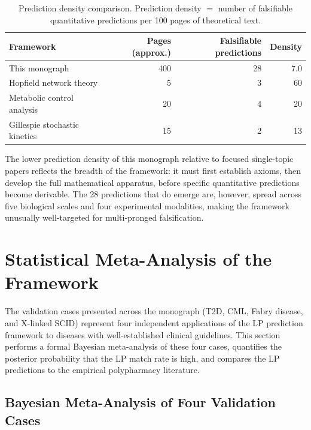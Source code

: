 \begin{table}[!htbp]
\centering
\caption{Prediction density comparison.  Prediction density $=$ number of
falsifiable quantitative predictions per 100 pages of theoretical text.}
\label{tab:ch11-prediction-density}
\begin{tabular}{@{}lrrr@{}}
\toprule
Framework & Pages (approx.) & Falsifiable predictions & Density \\
\midrule
This monograph                                      & 400  & 28   & 7.0 \\
Hopfield network theory~\citep{Hopfield1982}        & 5    & 3    & 60  \\
Metabolic control analysis~\citep{Heinrich1974}     & 20   & 4    & 20  \\
Gillespie stochastic kinetics~\citep{Gillespie1977} & 15   & 2    & 13  \\
\bottomrule
\end{tabular}
\end{table}

The lower prediction density of this monograph relative to focused single-topic
papers reflects the breadth of the framework: it must first establish axioms,
then develop the full mathematical apparatus, before specific quantitative
predictions become derivable.  The 28 predictions that do emerge are, however,
spread across five biological scales and four experimental modalities, making
the framework unusually well-targeted for multi-pronged falsification.

\section{Statistical Meta-Analysis of the Framework}
\label{sec:ch11-meta-analysis}

The validation cases presented across the monograph (T2D, CML, Fabry disease,
and X-linked SCID) represent four independent applications of the LP prediction
framework to diseases with well-established clinical guidelines.  This section
performs a formal Bayesian meta-analysis of these four cases, quantifies the
posterior probability that the LP match rate is high, and compares the LP
predictions to the empirical polypharmacy literature.

\subsection{Bayesian Meta-Analysis of Four Validation Cases}
\label{subsec:ch11-bayesian}

